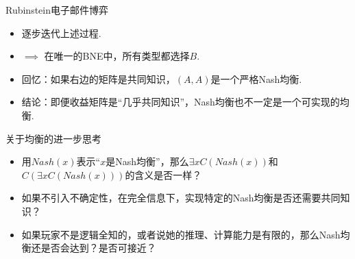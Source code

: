 {Rubinstein电子邮件博弈}
\begin{itemize}
\item 逐步迭代上述过程. 
\item $\implies$ 在唯一的BNE中，所有类型都选择$B$. 
\item 回忆：如果右边的矩阵是共同知识，$(A,A)$是一个严格Nash均衡. 
\item 结论：即便收益矩阵是“几乎共同知识”，Nash均衡也不一定是一个可实现的均衡. 
\end{itemize}


{关于均衡的进一步思考}
\begin{itemize}
    \item 用$Nash(x)$表示“$x$是Nash均衡”，那么$\exists x C(Nash(x))$和$C(\exists x C(Nash(x)))$的含义是否一样？
    \item 如果不引入不确定性，在完全信息下，实现特定的Nash均衡是否还需要共同知识？
    \item 如果玩家不是逻辑全知的，或者说她的推理、计算能力是有限的，那么Nash均衡还是否会达到？是否可接近？
\end{itemize}

\endgroup